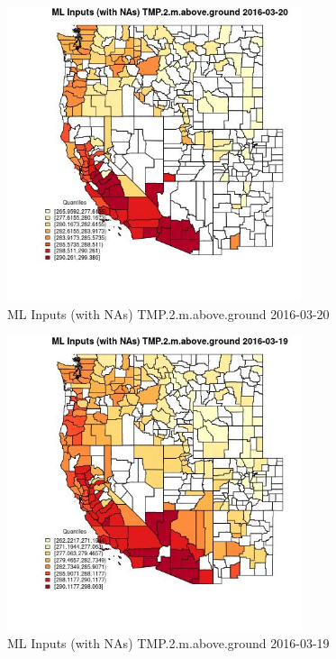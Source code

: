 \begin{figure} 
\centering  
\includegraphics[width=0.77\textwidth]{Code_Outputs/Report_ML_input_PM25_Step4_part_e_de_duplicated_aveswNAs_CountyTMP2mabovegroundMean2016-03-20_2016-03-20.jpg} 
\caption{\label{fig:Report_ML_input_PM25_Step4_part_e_de_duplicated_aveswNAsCountyTMP2mabovegroundMean2016-03-20_2016-03-20}ML Inputs (with NAs) TMP.2.m.above.ground 2016-03-20} 
\end{figure} 
 

\begin{figure} 
\centering  
\includegraphics[width=0.77\textwidth]{Code_Outputs/Report_ML_input_PM25_Step4_part_e_de_duplicated_aveswNAs_CountyTMP2mabovegroundMean2016-03-19_2016-03-19.jpg} 
\caption{\label{fig:Report_ML_input_PM25_Step4_part_e_de_duplicated_aveswNAsCountyTMP2mabovegroundMean2016-03-19_2016-03-19}ML Inputs (with NAs) TMP.2.m.above.ground 2016-03-19} 
\end{figure} 
 


